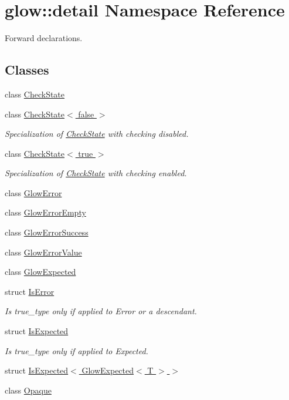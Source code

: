 \hypertarget{namespaceglow_1_1detail}{}\section{glow\+:\+:detail Namespace Reference}
\label{namespaceglow_1_1detail}


Forward declarations.  


\subsection*{Classes}
\begin{DoxyCompactItemize}
\item 
class \hyperlink{classglow_1_1detail_1_1_check_state}{Check\+State}
\item 
class \hyperlink{classglow_1_1detail_1_1_check_state_3_01false_01_4}{Check\+State$<$ false $>$}
\begin{DoxyCompactList}\small\item\em Specialization of \hyperlink{classglow_1_1detail_1_1_check_state}{Check\+State} with checking disabled. \end{DoxyCompactList}\item 
class \hyperlink{classglow_1_1detail_1_1_check_state_3_01true_01_4}{Check\+State$<$ true $>$}
\begin{DoxyCompactList}\small\item\em Specialization of \hyperlink{classglow_1_1detail_1_1_check_state}{Check\+State} with checking enabled. \end{DoxyCompactList}\item 
class \hyperlink{classglow_1_1detail_1_1_glow_error}{Glow\+Error}
\item 
class \hyperlink{classglow_1_1detail_1_1_glow_error_empty}{Glow\+Error\+Empty}
\item 
class \hyperlink{classglow_1_1detail_1_1_glow_error_success}{Glow\+Error\+Success}
\item 
class \hyperlink{classglow_1_1detail_1_1_glow_error_value}{Glow\+Error\+Value}
\item 
class \hyperlink{classglow_1_1detail_1_1_glow_expected}{Glow\+Expected}
\item 
struct \hyperlink{structglow_1_1detail_1_1_is_error}{Is\+Error}
\begin{DoxyCompactList}\small\item\em Is true\+\_\+type only if applied to Error or a descendant. \end{DoxyCompactList}\item 
struct \hyperlink{structglow_1_1detail_1_1_is_expected}{Is\+Expected}
\begin{DoxyCompactList}\small\item\em Is true\+\_\+type only if applied to Expected. \end{DoxyCompactList}\item 
struct \hyperlink{structglow_1_1detail_1_1_is_expected_3_01_glow_expected_3_01_t_01_4_01_4}{Is\+Expected$<$ Glow\+Expected$<$ T $>$ $>$}
\item 
class \hyperlink{classglow_1_1detail_1_1_opaque}{Opaque}
\end{DoxyCompactItemize}
